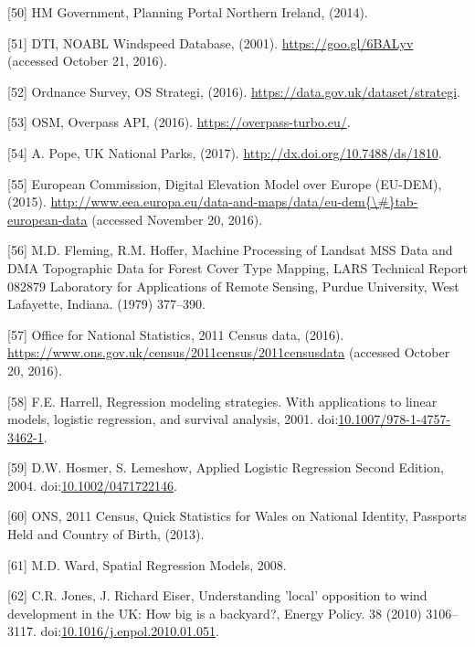 \documentclass[a4paper,]{article}
\theoremstyle{definition}
\theoremstyle{definition}
\theoremstyle{definition}
\theoremstyle{remark}
\begin{document}
\hypertarget{ref-HMGovernment2014}{}
{[}50{]} HM Government, Planning Portal Northern Ireland, (2014).

\hypertarget{ref-DTI2001}{}
{[}51{]} DTI, NOABL Windspeed Database, (2001).
\url{https://goo.gl/6BALyv} (accessed October 21, 2016).

\hypertarget{ref-Survey2016}{}
{[}52{]} Ordnance Survey, OS Strategi, (2016).
\url{https://data.gov.uk/dataset/strategi}.

\hypertarget{ref-Overpass2016}{}
{[}53{]} OSM, Overpass API, (2016). \url{https://overpass-turbo.eu/}.

\hypertarget{ref-Pope2017}{}
{[}54{]} A. Pope, UK National Parks, (2017).
\url{http://dx.doi.org/10.7488/ds/1810}.

\hypertarget{ref-Commission2015}{}
{[}55{]} European Commission, Digital Elevation Model over Europe
(EU-DEM), (2015).
\href{http://www.eea.europa.eu/data-and-maps/data/eu-dem\%7B/\#\%7Dtab-european-data}{http://www.eea.europa.eu/data-and-maps/data/eu-dem\{\textbackslash{}\#\}tab-european-data}
(accessed November 20, 2016).

\hypertarget{ref-Fleming1979}{}
{[}56{]} M.D. Fleming, R.M. Hoffer, Machine Processing of Landsat MSS
Data and DMA Topographic Data for Forest Cover Type Mapping, LARS
Technical Report 082879 Laboratory for Applications of Remote Sensing,
Purdue University, West Lafayette, Indiana. (1979) 377--390.

\hypertarget{ref-OfficeforNationalStatistics}{}
{[}57{]} Office for National Statistics, 2011 Census data, (2016).
\url{https://www.ons.gov.uk/census/2011census/2011censusdata} (accessed
October 20, 2016).

\hypertarget{ref-Harrell2001}{}
{[}58{]} F.E. Harrell, Regression modeling strategies. With applications
to linear models, logistic regression, and survival analysis, 2001.
doi:\href{https://doi.org/10.1007/978-1-4757-3462-1}{10.1007/978-1-4757-3462-1}.

\hypertarget{ref-Hosmer2004}{}
{[}59{]} D.W. Hosmer, S. Lemeshow, Applied Logistic Regression Second
Edition, 2004.
doi:\href{https://doi.org/10.1002/0471722146}{10.1002/0471722146}.

\hypertarget{ref-ONS2013}{}
{[}60{]} ONS, 2011 Census, Quick Statistics for Wales on National
Identity, Passports Held and Country of Birth, (2013).

\hypertarget{ref-Ward2008}{}
{[}61{]} M.D. Ward, Spatial Regression Models, 2008.

\hypertarget{ref-Jones2010a}{}
{[}62{]} C.R. Jones, J. Richard Eiser, Understanding 'local' opposition
to wind development in the UK: How big is a backyard?, Energy Policy. 38
(2010) 3106--3117.
doi:\href{https://doi.org/10.1016/j.enpol.2010.01.051}{10.1016/j.enpol.2010.01.051}.
\end{document}
